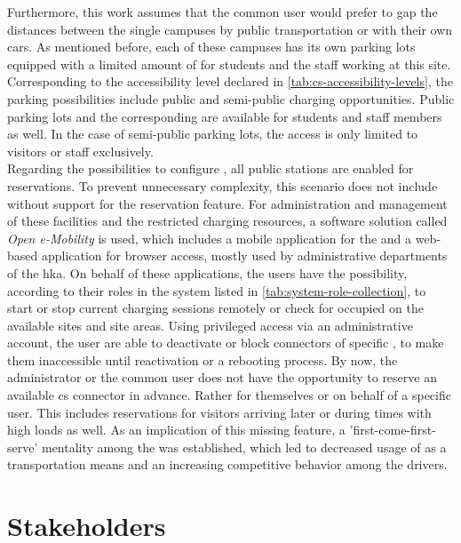 \noindent Furthermore, this work assumes that the common user would prefer to gap the distances between the single campuses by public transportation or with their own cars.
As mentioned before, each of these campuses has its own parking lots equipped with a limited amount of  for students and the staff working at this site. Corresponding to the accessibility level declared in \ref{tab:cs-accessibility-levels}, the parking possibilities include public and semi-public charging opportunities.
Public parking lots and the corresponding  are available for students and staff members as well. In the case of semi-public parking lots, the access is only limited to visitors or staff exclusively. \\
Regarding the possibilities to configure , all public stations are enabled for reservations. To prevent unnecessary complexity, this scenario does not include  without support for the reservation feature.
For administration and management of these facilities and the restricted charging resources, a software solution called \textit{Open e-Mobility} \cite{noauthor_github_nodate,noauthor_github_nodate-1,noauthor_github_nodate-3} is used, which includes a mobile application for the  and a web-based application for browser access, mostly used by administrative departments of the \acrshort{hka}. 
On behalf of these applications, the users have the possibility, according to their roles in the system listed in \ref{tab:system-role-collection}, to start or stop current charging sessions remotely or check for occupied  on the available sites and site areas.
Using privileged access via an administrative account, the user are able to deactivate or block connectors of specific , to make them inaccessible until reactivation or a rebooting process.
By now, the administrator or the common user does not have the opportunity to reserve an available \acrshort{cs} connector in advance. Rather for themselves or on behalf of a specific user. This includes reservations for visitors arriving later or during times with high loads as well.
As an implication of this missing feature, a 'first-come-first-serve' mentality among the  was established, which led to decreased usage of  as a transportation means and an increasing competitive behavior among the drivers.

\section{Stakeholders}
\label{ch:Requirements Engineering:sec:Stakeholders}

